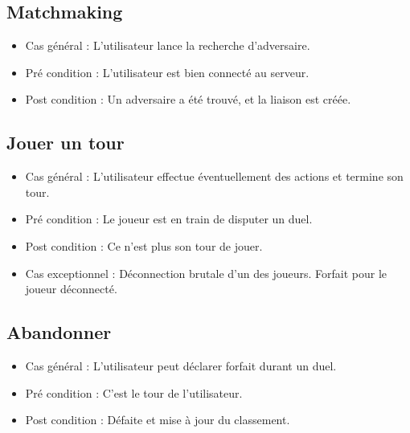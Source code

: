 \subsection{Matchmaking}
\begin{itemize}
    \item Cas général : L'utilisateur lance la recherche d'adversaire.
    \item Pré condition  : L'utilisateur est bien connecté au serveur.
    \item Post condition : Un adversaire a été trouvé, et la liaison est créée.
\end{itemize}
\subsection{Jouer un tour}
\begin{itemize}
    \item Cas général : L'utilisateur effectue éventuellement des actions et termine son tour.
    \item Pré condition  : Le joueur est en train de disputer un duel.
    \item Post condition : Ce n'est plus son tour de jouer.
    \item Cas exceptionnel :  Déconnection brutale d'un des joueurs. Forfait pour le joueur déconnecté.
\end{itemize}
\subsection{Abandonner}
\begin{itemize}
    \item Cas général : L'utilisateur peut déclarer forfait durant un duel.
    \item Pré condition  : C'est le tour de l'utilisateur.
    \item Post condition : Défaite et mise à jour du classement.
\end{itemize}

